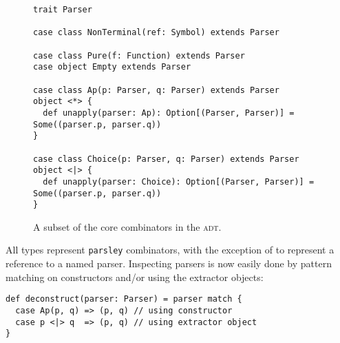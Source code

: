 \documentclass[../../main.tex]{subfiles}
\begin{document}
\begin{figure}[htbp]
\begin{verbatim}
trait Parser

case class NonTerminal(ref: Symbol) extends Parser

case class Pure(f: Function) extends Parser
case object Empty extends Parser

case class Ap(p: Parser, q: Parser) extends Parser
object <*> {
  def unapply(parser: Ap): Option[(Parser, Parser)] = Some((parser.p, parser.q))
}

case class Choice(p: Parser, q: Parser) extends Parser
object <|> {
  def unapply(parser: Choice): Option[(Parser, Parser)] = Some((parser.p, parser.q))
}
\end{verbatim}
\caption{A subset of the core combinators in the  \textsc{adt}.}
\label{fig:parser-adt}
\end{figure}

All  types represent \texttt{parsley} combinators, with the exception of  to represent a reference to a named parser.
Inspecting parsers is now easily done by pattern matching on constructors and/or using the extractor objects:
\begin{verbatim}
def deconstruct(parser: Parser) = parser match {
  case Ap(p, q) => (p, q) // using constructor
  case p <|> q  => (p, q) // using extractor object
}
\end{verbatim}

\end{document}
